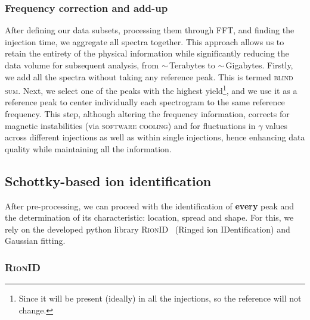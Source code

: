 \subsubsection{Frequency correction and add-up}\label{subsubsec:chap2:freqcorrection}
After defining our data subsets, processing them through \textsc{FFT}, and finding the injection time, we aggregate all spectra together. This approach allows us to retain the entirety of the physical information while significantly reducing the data volume for subsequent analysis, from $\sim$\,Terabytes to $\sim$\,Gigabytes.
\newpar
Firstly, we add all the spectra without taking any reference peak. This is termed \textsc{blind sum}.
Next, we select one of the peaks with the highest yield\footnote{Since it will be present (ideally) in all the injections, so the reference will not change.}, and we use it as a reference peak to center individually each spectrogram to the same reference frequency. This step, although altering the frequency information, corrects for magnetic instabilities (via \textsc{software cooling}) and for fluctuations in $\gamma$ values across different injections as well as within single injections, hence enhancing data quality while maintaining all the information.

\subsection{Schottky-based ion identification}\label{subsec:chap2:identification}
After pre-processing, we can proceed with the identification of \textbf{every} peak and the determination of its characteristic: location, spread and shape. For this, we rely on the developed python library \textsc{RionID}~\cite{rionid} (Ringed ion IDentification) and Gaussian fitting.
\subsubsection{\textsc{RionID}}\label{subsubsec:chap2:rionid}

